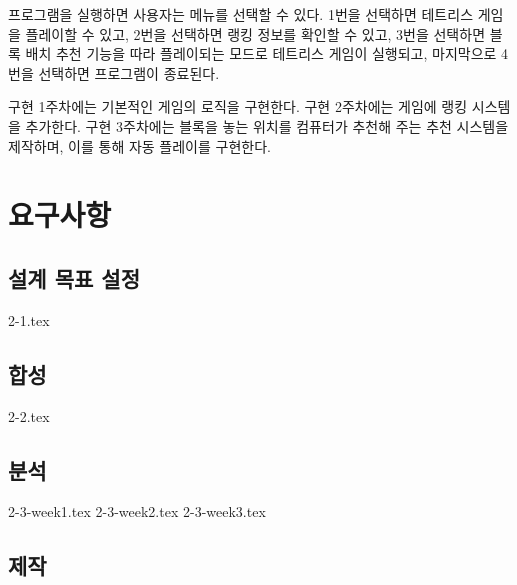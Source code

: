 프로그램을 실행하면 사용자는 메뉴를 선택할 수 있다. 1번을 선택하면 테트리스 게임을 플레이할 수 있고, 2번을 선택하면 랭킹 정보를 확인할 수 있고, 3번을 선택하면 블록 배치 추천 기능을 따라 플레이되는 모드로 테트리스 게임이 실행되고, 마지막으로 4번을 선택하면 프로그램이 종료된다.

구현 1주차에는 기본적인 게임의 로직을 구현한다. 구현 2주차에는 게임에 랭킹 시스템을 추가한다. 구현 3주차에는 블록을 놓는 위치를 컴퓨터가 추천해 주는 추천 시스템을 제작하며, 이를 통해 자동 플레이를 구현한다.
\newpage

\section{요구사항}
\subsection{설계 목표 설정}
{2-1.tex}

\subsection{합성}
{2-2.tex}

\newpage
\subsection{분석}
{2-3-week1.tex}
{2-3-week2.tex}
{2-3-week3.tex}

\subsection{제작}

